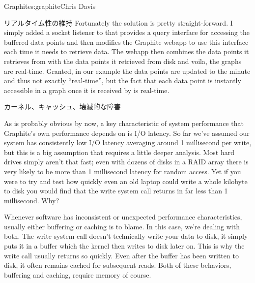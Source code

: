 \begin{aosachapter}{Graphite}{s:graphite}{Chris Davis}
\begin{aosasect1}{リアルタイム性の維持}
Fortunately the solution is pretty straight-forward. I simply added a
socket listener to  that provides a query interface for
accessing the buffered data points and then modifies the Graphite
webapp to use this interface each time it needs to retrieve data.  The
webapp then combines the data points it retrieves from  with the
data points it retrieved from disk and voila, the graphs are
real-time. Granted, in our example the data points are updated to the
minute and thus not exactly ``real-time'', but the fact that each data
point is instantly accessible in a graph once it is received by 
is real-time.

\end{aosasect1}

\vspace{-0.1cm} %

\begin{aosasect1}{カーネル、キャッシュ、壊滅的な障害}

\vspace{-0.1cm} %

As is probably obvious by now, a key characteristic of system
performance that Graphite's own performance depends on is I/O latency.
So far we've assumed our system has consistently low I/O latency
averaging around 1 millisecond per write, but this is a big assumption
that requires a little deeper analysis. Most hard drives simply aren't
that fast; even with dozens of disks in a RAID array there is very
likely to be more than 1 millisecond latency for random access. Yet if
you were to try and test how quickly even an old laptop could write a
whole kilobyte to disk you would find that the write system call
returns in far less than 1 millisecond. Why?

Whenever software has inconsistent or unexpected performance
characteristics, usually either buffering or caching is to blame. In
this case, we're dealing with both. The write system call doesn't
technically write your data to disk, it simply puts it in a buffer
which the kernel then writes to disk later on. This is why the write
call usually returns so quickly. Even after the buffer has been
written to disk, it often remains cached for subsequent reads. Both of
these behaviors, buffering and caching, require memory of
course.


\end{aosasect1}
\end{aosachapter}
